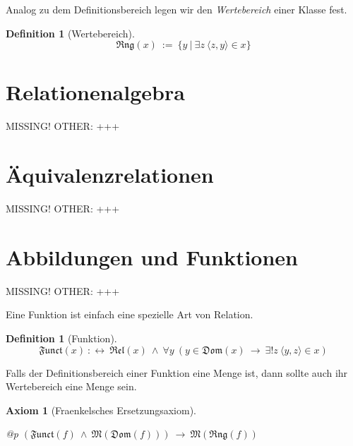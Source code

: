 \documentclass[a4paper,german,10pt,twoside]{book}
\newtheorem{ax}{Axiom}
\theoremstyle{definition}
\newtheorem{defn}[thm]{Definition}
\theoremstyle{remark}
\begin{document}
\par
Analog zu dem Definitionsbereich legen wir den \emph{Wertebereich} einer Klasse fest.

\begin{defn}[Wertebereich]
\label{definition:range} \hypertarget{definition:range}{}
$$\mathfrak{Rng}(x)\ := \ \{ y \ | \ \exists z\ \langle z, y \rangle \in x \} $$

\end{defn}




\section{Relationenalgebra} \label{chapter4_section4} \hypertarget{chapter4_section4}{}
MISSING! OTHER: +++

\section{{\"A}quivalenzrelationen} \label{chapter4_section5} \hypertarget{chapter4_section5}{}
MISSING! OTHER: +++

\section{Abbildungen und Funktionen} \label{chapter4_section6} \hypertarget{chapter4_section6}{}
MISSING! OTHER: +++

\par
Eine Funktion ist einfach eine spezielle Art von Relation.

\begin{defn}[Funktion]
\label{definition:function} \hypertarget{definition:function}{}
$$\mathfrak{Funct}(x)\ :\leftrightarrow \ \mathfrak{Rel}(x)\ \land \ \forall y\ (y \in \mathfrak{Dom}(x)\ \rightarrow \ \exists! z\ \langle y, z \rangle \in x)$$

\end{defn}




\par
Falls der Definitionsbereich einer Funktion eine Menge ist, dann sollte auch ihr Wertebereich eine Menge sein.

\begin{ax}[Fraenkelsches Ersetzungsaxiom]
\label{axiom:FraenkelsReplacement} \hypertarget{axiom:FraenkelsReplacement}{}
\mbox{}
\begin{longtable}{{@{\extracolsep{\fill}}p{\linewidth}}}
\centering $(\mathfrak{Funct}(f)\ \land \ \mathfrak{M}(\mathfrak{Dom}(f)))\ \rightarrow \ \mathfrak{M}(\mathfrak{Rng}(f))$
\end{longtable}

\end{ax}
\end{document}
